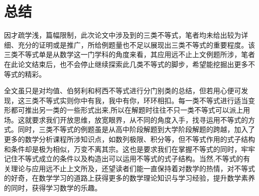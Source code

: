 \chapter{总结}

因才疏学浅，篇幅限制，此次论文中涉及到的三类不等式，笔者均未给出较为详细、充分的证明或是推广，所给例题量也不足以展现出三类不等式的重要程度。该三类不等式单是从数学这一门学科的角度来看，其应用远不止上文例题所涉，笔者在此论文结束后，也不会停止继续探索此几类不等式的脚步，希望能挖掘出更多不等式的精彩。

全文虽只是对均值、伯努利和柯西不等式进行分门别类的总结，但若用心便可发现，这三类不等式实则你中有我，我中有你，环环相扣。每一类不等式进行适当变形都可推出另一类的一些形式出来,所以在解题时往往不只一类不等式可以派上用场。这就要求我们开放思维，放宽眼界，从不同的角度入手，找寻运用不等式的方式。同时，三类不等式的例题虽是从高中阶段解题到大学阶段解题的跨越，加入了更多的数学分析课程所涉知识点，如数列极限、积分等，但不等式作用的式子结构和条件却是极为相似，万变不离其宗。这也是要求我们在掌握不等式的同时，牢牢记住不等式成立的条件以及构造出可以运用不等式的式子结构。当然,不等式的有关理论与应用远不止上文所及，还望读者们能一直保持着对数学的热情，对不等式的好奇，在数学学习的道路上获得更多的数学理论知识与学习经验，提升数学素养的同时，获得学习数学的乐趣。